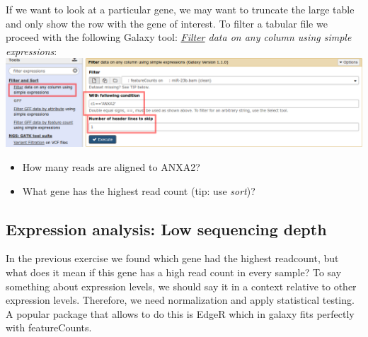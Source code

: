 If we want to look at a particular gene, we may want to truncate the large table and only show the row with the gene of interest.
To filter a tabular file we proceed with the following Galaxy tool: 
\textit{\underline{Filter} data on any column using simple expressions}:\\
\includegraphics[width=\textwidth]{figures/expression_02.png}\\
\begin{itemize}
	\item How many reads are aligned to ANXA2?
	\item What gene has the highest read count (tip: use \textit{sort})?
\end{itemize}

\subsection{Expression analysis: Low sequencing depth}
In the previous exercise we found which gene had the highest readcount, but what does it mean if this gene has a high read count in every sample?
To say something about expression levels, we should say it in a context relative to other expression levels. Therefore, we need normalization and apply statistical testing. A popular package that allows to do this is EdgeR which in galaxy fits perfectly with featureCounts.

